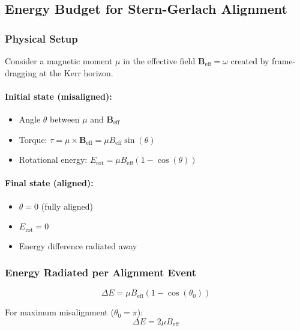 \subsection{Energy Budget for Stern-Gerlach Alignment}

\subsubsection{Physical Setup}

Consider a magnetic moment $\mu$ in the effective field $\mathbf{B}_{\text{eff}} = \omega$ created by frame-dragging at the Kerr horizon.

\paragraph{Initial state (misaligned):}
\begin{itemize}
\item Angle $\theta$ between $\mu$ and $\mathbf{B}_{\text{eff}}$
\item Torque: $\tau = \mu \times \mathbf{B}_{\text{eff}} = \mu B_{\text{eff}} \sin(\theta)$
\item Rotational energy: $E_{\text{rot}} = \mu B_{\text{eff}}(1 - \cos(\theta))$
\end{itemize}

\paragraph{Final state (aligned):}
\begin{itemize}
\item $\theta = 0$ (fully aligned)
\item $E_{\text{rot}} = 0$
\item Energy difference radiated away
\end{itemize}

\subsubsection{Energy Radiated per Alignment Event}

\begin{equation}
\Delta E = \mu B_{\text{eff}}(1 - \cos(\theta_0))
\end{equation}

For maximum misalignment ($\theta_0 = \pi$):
\begin{equation}
\Delta E = 2\mu B_{\text{eff}}
\end{equation}

